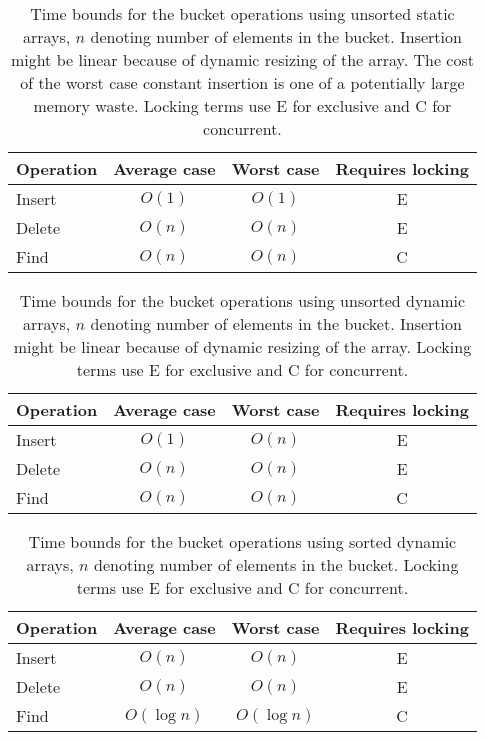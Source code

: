 \begin{table}[h!]
    \centering
    \begin{tabular}[here]{ l || c | c | c}
        Operation & Average case & Worst case & Requires locking  \\ \hline
        Insert    & $O(1)$ & $O(1)$ & E \\ \hline
        Delete    & $O(n)$ & $O(n)$ & E \\ \hline
        Find      & $O(n)$ & $O(n)$ & C  \\ \hline
    \end{tabular}
    \caption{Time bounds for the bucket operations using unsorted static
    arrays, $n$ denoting number of elements in the bucket. Insertion might be
    linear because of dynamic resizing of the array. The cost of the worst case
    constant insertion is one of a potentially large memory waste. Locking
    terms use E for exclusive and C for concurrent.}
    \label{tab:bounds:unsortedarray}
\end{table}
\begin{table}[h!]
    \centering
    \begin{tabular}[here]{ l || c | c | c}
        Operation & Average case & Worst case & Requires locking  \\ \hline
        Insert    & $O(1)$ & $O(n)$ & E \\ \hline
        Delete    & $O(n)$ & $O(n)$ & E \\ \hline
        Find      & $O(n)$ & $O(n)$ & C  \\ \hline
    \end{tabular}
    \caption{Time bounds for the bucket operations using unsorted dynamic
    arrays, $n$ denoting number of elements in the bucket. Insertion might be
    linear because of dynamic resizing of the array. Locking terms use E for
        exclusive and C for concurrent.}
    \label{tab:bounds:unsorteddynarray}
\end{table}
\begin{table}[h!]
    \centering
    \begin{tabular}[here]{ l || c | c | c}
        Operation & Average case & Worst case & Requires locking  \\ \hline
        Insert    & $O(n)$ & $O(n)$           & E \\ \hline
        Delete    & $O(n)$ & $O(n)$           & E \\ \hline
        Find      & $O(\log n)$ & $O(\log n)$ & C  \\ \hline
    \end{tabular}
    \caption{Time bounds for the bucket operations using sorted dynamic arrays,
    $n$ denoting number of elements in the bucket. Locking terms use E for
        exclusive and C for concurrent.}
    \label{tab:bounds:sortedarray}
\end{table}

